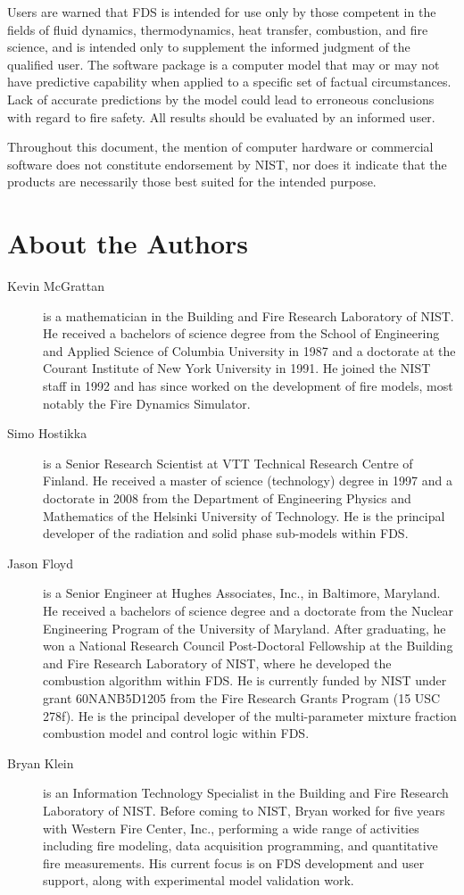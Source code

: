 \documentclass[11pt]{book}
\begin{document}
Users are warned that FDS is intended for use only by those competent
in the fields of fluid dynamics, thermodynamics, heat transfer, combustion, and fire science,
and is intended only to supplement the informed judgment of the qualified user.
The software package is a computer model that may or may not have predictive
capability when applied to a specific set of factual circumstances.
Lack of accurate predictions by the model could lead to erroneous
conclusions with regard to fire safety. All results should be evaluated by an informed user.

Throughout this document, the mention of computer hardware or commercial
software does not constitute endorsement by NIST, nor does it indicate that
the products are necessarily those best suited for the intended purpose.


\chapter{About the Authors}

\begin{description}
\item[Kevin McGrattan] is a mathematician in the Building and Fire
Research Laboratory of NIST. He received a bachelors of science degree
from the School of Engineering and Applied Science of Columbia
University in 1987 and a doctorate at the Courant Institute of New
York University in 1991. He joined the NIST staff in 1992 and has
since worked on the development of fire models, most notably the Fire
Dynamics Simulator.
\item[Simo Hostikka] is a Senior Research Scientist at VTT Technical
Research Centre of Finland. He received a master of science
(technology) degree in 1997 and a doctorate in 2008 from
the Department of Engineering Physics and Mathematics of the
Helsinki University of Technology.  He is the principal developer of the
radiation and solid phase sub-models within FDS.
\item[Jason Floyd] is a Senior Engineer at Hughes Associates, Inc., in
Baltimore, Maryland. He received a bachelors of science degree and a
doctorate from the Nuclear Engineering Program of the University of
Maryland. After graduating, he won a National Research Council
Post-Doctoral Fellowship at the Building and Fire Research Laboratory
of NIST, where he developed the combustion algorithm within FDS. He is
currently funded by NIST under grant 60NANB5D1205 from the Fire
Research Grants Program (15 USC 278f).  He is the principal developer
of the multi-parameter mixture fraction combustion model and control
logic within FDS.
\item[Bryan Klein] is an Information Technology Specialist in the
Building and Fire Research Laboratory of NIST.  Before coming to NIST,
Bryan worked for five years with Western Fire Center, Inc., performing a
wide range of activities including fire modeling, data acquisition programming,
and quantitative fire measurements. His current focus is on FDS development and
user support, along with experimental model validation work.
\end{description}
\end{document}
